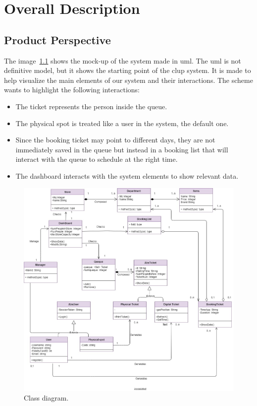 \chapter{Overall Description}

\section{Product Perspective}
The image~\ref{figure:UML} shows the mock-up of the system made in \gls{uml}. The \gls{uml} is not definitive model, but it shows the starting point of the \gls{clup} system. It is made to help visualize the main elements of our system and their interactions. The scheme wants to highlight the following interactions:
\begin{itemize}

	\item The ticket represents the person inside the queue.

	\item The physical spot is treated like a user in the system, the default one. 

	\item Since the booking ticket may point to different days, they are not immediately saved in the queue but instead in a booking list that will interact with the 	queue to schedule at the right time.

	\item The dashboard interacts with the system elements to show relevant data. 
\end{itemize}

\begin{figure}[H]
	\centering
	\includegraphics[width=1.0\textwidth]{images/uml.jpg}
	\caption{Class diagram.}
	\label{figure:UML}
\end{figure}


